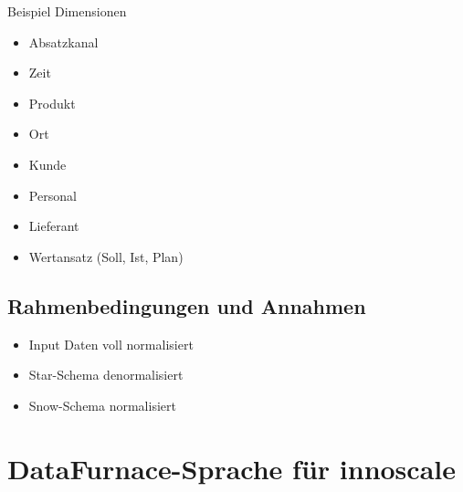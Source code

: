 \documentclass[
  language=german, %
  type=bachelor%
]{isthesis}
\begin{document}
\begin{content}
  Beispiel Dimensionen
  \begin{itemize}
    \item Absatzkanal
    \item Zeit
    \item Produkt
    \item Ort
    \item Kunde
    \item Personal
    \item Lieferant
    \item Wertansatz (Soll, Ist, Plan)
  \end{itemize}

  \section{Rahmenbedingungen und Annahmen}
  \begin{itemize}
    \item Input Daten voll normalisiert
    \item Star-Schema denormalisiert
    \item Snow-Schema normalisiert
  \end{itemize}

  \chapter{DataFurnace-Sprache für innoscale}



\end{content}
\end{document}
